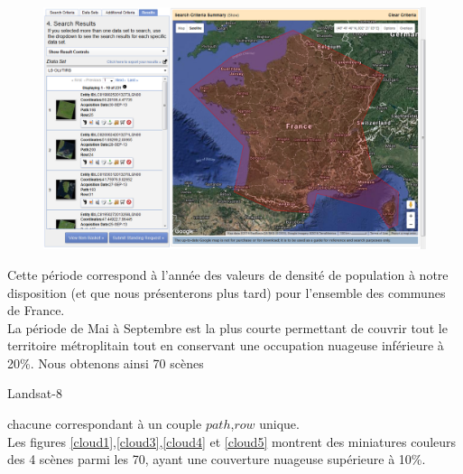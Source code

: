 \documentclass{book}
\begin{document}
\begin{figure}[H]
\begin{center}
\includegraphics[scale=0.5]{images/france-selection.png}
\end{center}
\label{selection_france}
\end{figure}

Cette période correspond à l'année des valeurs de densité de population à notre disposition (et que nous présenterons plus tard) pour l'ensemble des communes de France.\\
La période de Mai à Septembre est la plus courte permettant de couvrir tout le territoire métroplitain tout en conservant une occupation
nuageuse inférieure à 20\%.
Nous obtenons ainsi 70 scènes \begin{itshape}Landsat-8\end{itshape} chacune correspondant à un couple $path$,$row$ unique.\\
Les figures \ref{cloud1},\ref{cloud3},\ref{cloud4} et \ref{cloud5} montrent des miniatures couleurs des 4 scènes parmi les 70, ayant une couverture 
nuageuse supérieure à 10\%.
\end{document}
